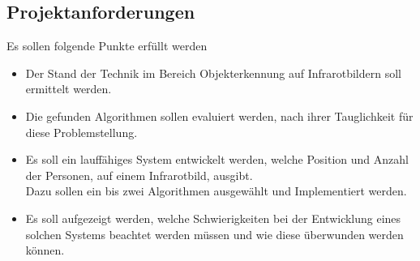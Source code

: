 \subsection{Projektanforderungen}
\label{sec:Requirements}

Es sollen folgende Punkte erfüllt werden

\begin{itemize}
	\item Der Stand der Technik im Bereich Objekterkennung auf Infrarotbildern soll ermittelt werden.
	\item Die gefunden Algorithmen sollen evaluiert werden, nach ihrer Tauglichkeit für diese Problemstellung.
	\item Es soll ein lauffähiges System entwickelt werden, welche Position und Anzahl der Personen, auf einem Infrarotbild, ausgibt.\\
	Dazu sollen ein bis zwei Algorithmen ausgewählt und Implementiert werden.
	\item Es soll aufgezeigt werden, welche Schwierigkeiten bei der Entwicklung eines solchen Systems beachtet werden müssen und wie diese überwunden werden können.

\end{itemize}




